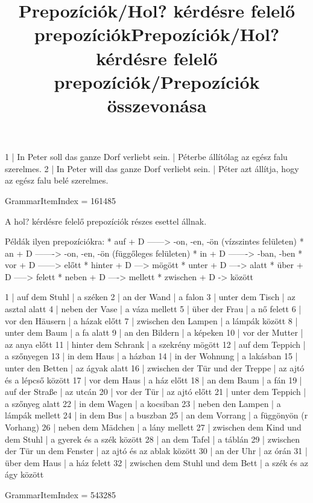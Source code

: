 \begin{exmp}
1 | In Peter soll das ganze Dorf verliebt sein. | Péterbe állítólag az egész falu szerelmes.
2 | In Peter will das ganze Dorf verliebt sein. | Péter azt állítja, hogy az egész falu belé szerelmes.
\end{exmp}

\title{Prepozíciók/Hol? kérdésre felelő prepozíciók}

GrammarItemIndex = 161485

\begin{desc}
A hol? kérdésre felelő prepozíciók részes esettel állnak.

Példák ilyen prepozíciókra:
* auf + D ------> -on, -en, -ön (vízszintes felületen)
* an + D -------> -on, -en, -ön (függőleges felületen)
* in + D -------> -ban, -ben
* vor + D ------> előtt
* hinter + D ---> mögött
* unter + D ----> alatt
* über + D -----> felett
* neben + D ----> mellett
* zwischen + D -> között
\end{desc}

\begin{exmp}
1 | auf dem Stuhl | a széken
2 | an der Wand | a falon
3 | unter dem Tisch | az asztal alatt
4 | neben der Vase | a váza mellett
5 | über der Frau | a nő felett
6 | vor den Häusern | a házak előtt
7 | zwischen den Lampen | a lámpák között
8 | unter dem Baum | a fa alatt
9 | an den Bildern | a képeken
10 | vor der Mutter | az anya előtt
11 | hinter dem Schrank | a szekrény mögött
12 | auf dem Teppich | a szőnyegen
13 | in dem Haus | a házban
14 | in der Wohnung | a lakásban
15 | unter den Betten | az ágyak alatt
16 | zwischen der Tür und der Treppe | az ajtó és a lépcső között
17 | vor dem Haus | a ház előtt
18 | an dem Baum | a fán
19 | auf der Straße | az utcán
20 | vor der Tür | az ajtó előtt
21 | unter dem Teppich | a szőnyeg alatt
22 | in dem Wagen | a kocsiban
23 | neben den Lampen | a lámpák mellett
24 | in dem Bus | a buszban
25 | an dem Vorrang | a függönyön (r Vorhang)
26 | neben dem Mädchen | a lány mellett
27 | zwischen dem Kind und dem Stuhl | a gyerek és a szék között
28 | an dem Tafel | a táblán
29 | zwischen der Tür un dem Fenster | az ajtó és az ablak között
30 | an der Uhr | az órán
31 | über dem Haus | a ház felett
32 | zwischen dem Stuhl und dem Bett | a szék és az ágy között
\end{exmp}

\title{Prepozíciók/Hol? kérdésre felelő prepozíciók/Prepozíciók összevonása}

GrammarItemIndex = 543285

